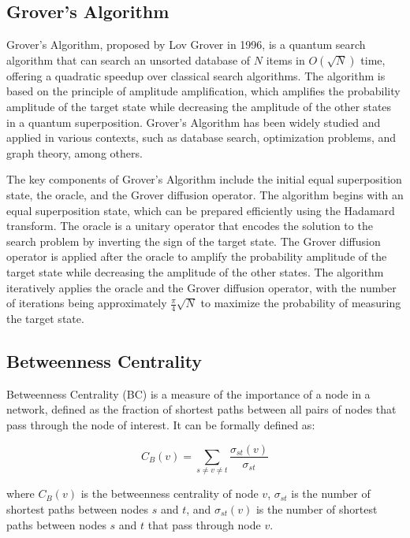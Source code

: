 \subsection{Grover's Algorithm}

Grover's Algorithm, proposed by Lov Grover in 1996, is a quantum search algorithm that can search an unsorted database of $N$ items in $O(\sqrt{N})$ time, offering a quadratic speedup over classical search algorithms. The algorithm is based on the principle of amplitude amplification, which amplifies the probability amplitude of the target state while decreasing the amplitude of the other states in a quantum superposition. Grover's Algorithm has been widely studied and applied in various contexts, such as database search, optimization problems, and graph theory, among others.

The key components of Grover's Algorithm include the initial equal superposition state, the oracle, and the Grover diffusion operator. The algorithm begins with an equal superposition state, which can be prepared efficiently using the Hadamard transform. The oracle is a unitary operator that encodes the solution to the search problem by inverting the sign of the target state. The Grover diffusion operator is applied after the oracle to amplify the probability amplitude of the target state while decreasing the amplitude of the other states. The algorithm iteratively applies the oracle and the Grover diffusion operator, with the number of iterations being approximately $\frac{\pi}{4}\sqrt{N}$ to maximize the probability of measuring the target state.

\subsection{Betweenness Centrality}

Betweenness Centrality (BC) is a measure of the importance of a node in a network, defined as the fraction of shortest paths between all pairs of nodes that pass through the node of interest. It can be formally defined as:

\begin{equation}
C_B(v) = \sum_{s \neq v \neq t} \frac{\sigma_{st}(v)}{\sigma_{st}}
\end{equation}

where $C_B(v)$ is the betweenness centrality of node $v$, $\sigma_{st}$ is the number of shortest paths between nodes $s$ and $t$, and $\sigma_{st}(v)$ is the number of shortest paths between nodes $s$ and $t$ that pass through node $v$. 

